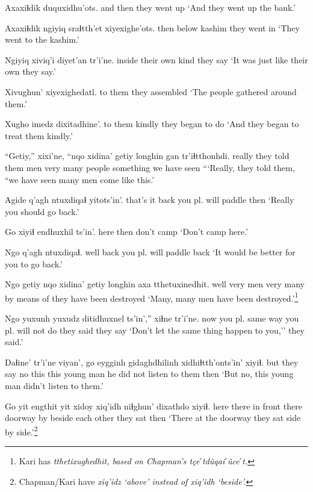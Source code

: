 \documentclass[12pt]{article}
\begin{document}
\gll Axaxiɬdik duquxidhu'ots.
{and then} {they went up}
\glt `And they went up the bank.'
\glend

\gll Axaxiɬdik ngiyiq sraɬtth'et xiyexighe'ots.
then  below  kashim  {they went in}
\glt `They went to the kashim.'
\glend

\gll Ngiyiq {xiviq'i diyet'an} tr'i'ne.
inside  {their own kind}  {they say}
\glt `It was just like their own they say.'
\glend

\gll Xivughun' xiyexighedatl.
{to them} {they assembled}
\glt `The people gathered around them.'
\glend

\gll Xugho imedz  dixitadhine'.
{to them} kindly  {they began to do}
\glt `And they began to treat them kindly.'
\glend

\gll ``Getiy,'' xixi'ne, {``nqo xidina'} getiy longhin gan tr'iɬtthonhdi.
really  {they told them}  men   very {many people} something {we have seen}
\glt ```Really, they told them, ``we have seen many men come like this.'
\glend

\gll Agide  q'agh ntuxdiqaɬ yitots'in'.
{that's it} back {you pl. will paddle} then
\glt `Really you should go back.'
\glend

\gll Go xiyiɬ {endhuxhil ts'in'.}
here then {don't camp}
\glt `Don't camp here.'
\glend

\gll Ngo q'agh ntuxdiqaɬ.
well back {you pl. will paddle back}
\glt `It would be better for you to go back.'
\glend

\gll Ngo getiy {nqo xidina'} getiy longhin axa tthetuxinedhit.
well very men   very many {by means of} {they have been destroyed}
\glt `Many, many men have been destroyed.'\footnote{Kari has \em tthetixughedhit, \em based on Chapman's \em t\c{c}eˊtd\^uqaiˊ\^uceˊt.}
\glend

\gll Ngo yuxunh yuxudz {ditidhuxnel ts'in',''} xiɬne  tr'i'ne.
now {you pl.} {same way} {you pl. will not do} {they said} {they say}
\glt `Don't let the same thing happen to you,'' they said.'
\glend

\gll Daɬine' tr'i'ne viyan', go eygginh gidaghdhilinh xidhiɬtth'onts'in' xiyiɬ.
but {they say} no  this this  {young man} {he did not listen to them} then
\glt `But no, this young man didn't listen to them.'
\glend

\gll Go yit engthit yit xidoy xiq'idh niɬghun'  dixathdo xiyiɬ.
here there {in front} there doorway by  {beside each other} {they sat} then
\glt `There at the doorway they sat side by side.'\footnote{Chapman/Kari have \em xiq'idz \em `above' instead of \em xiq'idh \em `beside'.}
\glend
\end{document}
